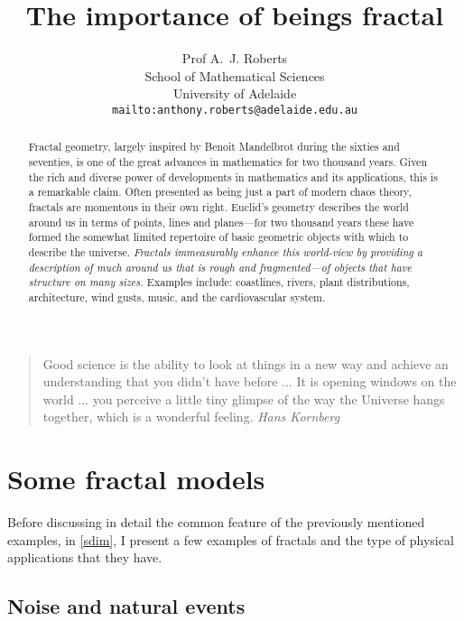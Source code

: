 \documentclass[12pt,a5paper]{article}
\title{The importance of beings fractal}
\author{Prof A.~J. Roberts\\
School of Mathematical Sciences\\
University of Adelaide\\
\texttt{mailto:anthony.roberts@adelaide.edu.au}
}
\begin{document}
\maketitle


\begin{quote}
	Good science is the ability to look at things in a new way and 
	achieve an understanding that you didn't have before ... It is opening 
	windows on the world ... you perceive a little tiny glimpse of the way 
	the Universe hangs together, which is a wonderful feeling.  \emph{Hans 
	Kornberg}
\end{quote}

\begin{abstract}
	Fractal geometry, largely inspired by Benoit Mandelbrot during the 
	sixties and seventies, is one of the great advances in mathematics 
	for two thousand years.  Given the rich and diverse power of 
	developments in mathematics and its applications, this is a 
	remarkable claim.  Often presented as being just a part of modern 
	chaos theory, fractals are momentous in their own right.  Euclid's 
	geometry describes the world around us in terms of points, lines and 
	planes---for two thousand years these have formed the somewhat 
	limited repertoire of basic geometric objects with which to describe 
	the universe.  \emph{Fractals immeasurably enhance this world-view by 
	providing a description of much around us that is rough and 
	fragmented---of objects that have structure on many sizes.}  Examples 
	include: coastlines, rivers, plant distributions, architecture, wind 
	gusts, music, and the cardiovascular system.  
\end{abstract}

\tableofcontents

\section{Some fractal models}
\label{sfrac}

Before discussing in detail the common feature of the previously 
mentioned examples, in \cref{sdim}, I present a few examples of 
fractals and the type of physical applications that they have.

\subsection{Noise and natural events}
\label{ssnoise}
\end{document}
